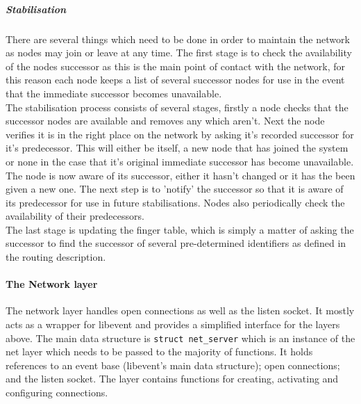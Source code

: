\documentclass{article}
\begin{document}
\subparagraph{Stabilisation} There are several things which need to be done in order to maintain the network as nodes may join or leave at any time. The first stage is to check the availability of the nodes successor as this is the main point of contact with the network, for this reason each node keeps a list of several successor nodes for use in the event that the immediate successor becomes unavailable.
\\
The stabilisation process consists of several stages, firstly a node checks that the successor nodes are available and removes any which aren't.
Next the node verifies it is in the right place on the network by asking it's recorded successor for it's predecessor. This will either be itself, a new node that has joined the system or none in the case that it's original immediate successor has become unavailable. The node is now aware of its successor, either it hasn't changed or it has the been given a new one. The next step is to 'notify' the successor so that it is aware of its predecessor for use in future stabilisations.
Nodes also periodically check the availability of their predecessors.
\\
The last stage is updating the finger table, which is simply a matter of asking the successor to find the successor of several pre-determined identifiers as defined in the routing description.



\paragraph{The Network layer}
The network layer handles open connections as well as the listen socket. It mostly acts as a wrapper for libevent and provides a simplified interface for the layers above. The main data structure is \texttt{struct net\_server} which is an instance of the net layer which needs to be passed to the majority of functions. It holds references to an event base (libevent's main data structure); open connections; and the listen socket. The layer contains functions for creating, activating and configuring connections.
\end{document}
